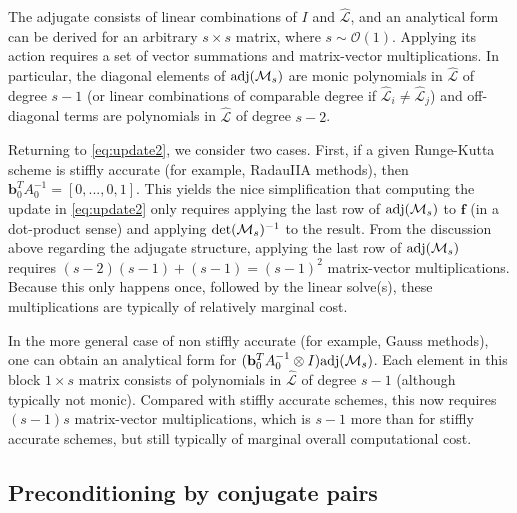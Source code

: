 \documentclass[review]{siamart}
\begin{document}
\begin{remark}
The adjugate consists of linear combinations of $I$ and $\widehat{\mathcal{L}}$, and an
analytical form can be derived for an arbitrary $s\times s$ matrix, where
$s\sim\mathcal{O}(1)$.
Applying its action requires a set of vector summations
and matrix-vector multiplications. In particular, the diagonal elements of
$\textnormal{adj}(\mathcal{M}_s)$ are monic polynomials in $\widehat{\mathcal{L}}$ of
degree $s-1$ (or linear combinations of comparable degree if
$\widehat{\mathcal{L}}_i\neq\widehat{\mathcal{L}}_j$)
and off-diagonal terms are polynomials in $\widehat{\mathcal{L}}$ of degree $s-2$. 

Returning to \eqref{eq:update2}, we consider two cases. First, if a given Runge-Kutta
scheme is stiffly accurate (for example, RadauIIA methods),
then $\mathbf{b}_0^TA_0^{-1} = [0,...,0,1]$. This yields
the nice simplification that computing the update in \eqref{eq:update2} only requires
applying the last row of $\textnormal{adj}(\mathcal{M}_s)$ to $\mathbf{f}$ (in a
dot-product sense) and applying $\textnormal{det}(\mathcal{M}_s)^{-1}$ to the result. From
the discussion above regarding the adjugate structure, applying the last row of
$\textnormal{adj}(\mathcal{M}_s)$ requires $(s-2)(s-1) + (s-1) = (s-1)^2$ matrix-vector
multiplications. Because this only happens once, followed by the linear solve(s),
these multiplications are typically of relatively marginal cost.

In the more general case of non stiffly accurate (for example, Gauss methods), one can
obtain an analytical form for
$(\mathbf{b}_0^TA_0^{-1}\otimes I)\textnormal{adj}(\mathcal{M}_s)$. Each element in
this block $1\times s$ matrix consists of polynomials in $\widehat{\mathcal{L}}$ of
degree $s-1$ (although
typically not monic). Compared with stiffly accurate schemes, this now requires 
$(s-1)s$ matrix-vector multiplications, which is $s-1$ more than for stiffly
accurate schemes, but still typically of marginal overall computational cost. 
\end{remark}

\subsection{Preconditioning by conjugate pairs}\label{sec:solve:prec}
\end{document}
